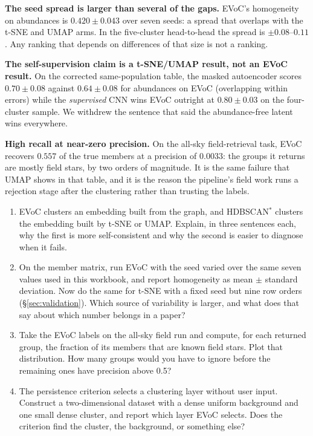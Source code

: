 \begin{issues} \textbf{The seed
spread is larger than several of the gaps.} EVoC's homogeneity on abundances is
$0.420 \pm 0.043$ over seven seeds: a spread that overlaps with the t-SNE and
UMAP arms. In the five-cluster head-to-head the spread is $\pm0.08$--$0.11$.
Any ranking that depends on differences of that size is not a ranking.

\textbf{The self-supervision claim is a t-SNE/UMAP result, not an EVoC result.}
On the corrected same-population table, the masked autoencoder scores $0.70 \pm
0.08$ against $0.64 \pm 0.08$ for abundances on EVoC (overlapping within
errors) while the \emph{supervised} CNN wins EVoC outright at $0.80 \pm 0.03$
on the four-cluster sample. We withdrew the sentence that said the
abundance-free latent wins everywhere.

\textbf{High recall at near-zero precision.} On the all-sky field-retrieval
task, EVoC recovers $0.557$ of the true members at a precision of $0.0033$:
the groups it returns are mostly field stars, by two orders of magnitude. It
is the same failure that UMAP shows in that table, and it is the reason the
pipeline's field work runs a rejection stage after the clustering rather than
trusting the labels.
\end{issues}

\begin{issues}[EXERCISES]
\begin{enumerate}
\item EVoC clusters an embedding built from the graph, and HDBSCAN$^*$
  clusters the embedding built by t-SNE or UMAP. Explain, in three sentences
  each, why the first is more self-consistent and why the second is easier to
  diagnose when it fails.
\item On the member matrix, run EVoC with the seed varied over the same seven
  values used in this workbook, and report homogeneity as mean $\pm$ standard
  deviation. Now do the same for t-SNE with a fixed seed but nine row orders
  (\S\ref{sec:validation}). Which source of variability is larger, and what
  does that say about which number belongs in a paper?
\item Take the EVoC labels on the all-sky field run and compute, for each
  returned group, the fraction of its members that are known field stars.
  Plot that distribution. How many groups would you have to ignore before the
  remaining ones have precision above 0.5?
\item The persistence criterion selects a clustering layer without user
  input. Construct a two-dimensional dataset with a dense uniform background
  and one small dense cluster, and report which layer EVoC selects. Does the
  criterion find the cluster, the background, or something else?
\end{enumerate}
\end{issues}
